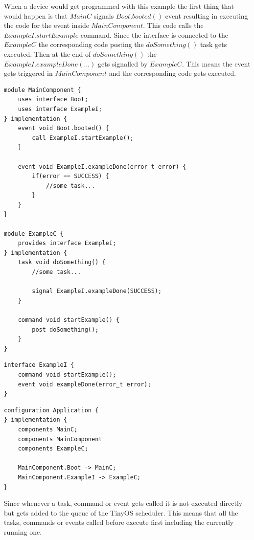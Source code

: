 When a device would get programmed with this example the first thing that would happen is that $MainC$ signals $Boot.booted()$ event resulting in executing the code for the event inside $MainComponent$. This code calls the $ExampleI.startExample$ command. Since the interface is connected to the $ExampleC$ the corresponding code posting the $doSomething()$ task gets executed. Then at the end of $doSomething()$ the $ExampleI.exampleDone(...)$ gets signalled by $ExampleC$. This means the event gets triggered in $MainComponent$ and the corresponding code gets executed.      

\begin{lstlisting}
module MainComponent {
	uses interface Boot;
	uses interface ExampleI;
} implementation {
	event void Boot.booted() {
		call ExampleI.startExample();
	}
	
	event void ExampleI.exampleDone(error_t error) {
		if(error == SUCCESS) {
			//some task...
		}
	}
}

module ExampleC {
	provides interface ExampleI;
} implementation {
	task void doSomething() {
		//some task...
		
		signal ExampleI.exampleDone(SUCCESS);
	}
	
	command void startExample() {
		post doSomething();
	}
}
\end{lstlisting}


\begin{lstlisting}
interface ExampleI {
	command void startExample();
	event void exampleDone(error_t error);
}
\end{lstlisting}

\begin{lstlisting}
configuration Application {
} implementation {
	components MainC;
	components MainComponent
	components ExampleC;
		
	MainComponent.Boot -> MainC;
	MainComponent.ExampleI -> ExampleC;
}
\end{lstlisting} 

Since whenever a task, command or event gets called it is not executed directly but gets added to the queue of the TinyOS scheduler. This means that all the tasks, commands or events called before execute first including the currently running one. 